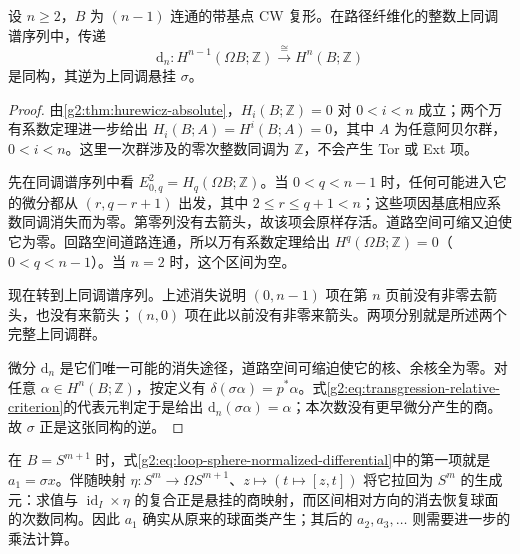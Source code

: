 \begin{proposition}\label{g2:prop:first-transgression-suspension}
	设 \(n\ge2\)，\(B\) 为 \((n-1)\) 连通的带基点 CW 复形。在路径纤维化的整数上同调谱序列中，传递
	\[
		\mathrm d_n:H^{n-1}(\Omega B;\mathbb Z)\xrightarrow{\cong}H^n(B;\mathbb Z)
	\]
	是同构，其逆为上同调悬挂 \(\sigma\)。
\end{proposition}
\begin{proof}
	由\cref{g2:thm:hurewicz-absolute}，\(H_i(B;\mathbb Z)=0\) 对 \(0<i<n\) 成立；两个万有系数定理进一步给出 \(H_i(B;A)=H^i(B;A)=0\)，其中 \(A\) 为任意阿贝尔群，\(0<i<n\)。这里一次群涉及的零次整数同调为 \(\mathbb Z\)，不会产生 Tor 或 Ext 项。

	先在同调谱序列中看 \(E^2_{0,q}=H_q(\Omega B;\mathbb Z)\)。当 \(0<q<n-1\) 时，任何可能进入它的微分都从 \((r,q-r+1)\) 出发，其中 \(2\le r\le q+1<n\)；这些项因基底相应系数同调消失而为零。第零列没有去箭头，故该项会原样存活。道路空间可缩又迫使它为零。回路空间道路连通，所以万有系数定理给出 \(H^q(\Omega B;\mathbb Z)=0\)（\(0<q<n-1\)）。当 \(n=2\) 时，这个区间为空。

	现在转到上同调谱序列。上述消失说明 \((0,n-1)\) 项在第 \(n\) 页前没有非零去箭头，也没有来箭头；\((n,0)\) 项在此以前没有非零来箭头。两项分别就是所述两个完整上同调群。

	微分 \(\mathrm d_n\) 是它们唯一可能的消失途径，道路空间可缩迫使它的核、余核全为零。对任意 \(\alpha\in H^n(B;\mathbb Z)\)，按定义有 \(\delta(\sigma\alpha)=p^*\alpha\)。式\eqref{g2:eq:transgression-relative-criterion}的代表元判定于是给出 \(\mathrm d_n(\sigma\alpha)=\alpha\)；本次数没有更早微分产生的商。故 \(\sigma\) 正是这张同构的逆。
\end{proof}

在 \(B=S^{m+1}\) 时，式\eqref{g2:eq:loop-sphere-normalized-differential}中的第一项就是 \(a_1=\sigma x\)。伴随映射 \(\eta:S^m\to\Omega S^{m+1}\)、\(z\mapsto(t\mapsto[z,t])\) 将它拉回为 \(S^m\) 的生成元：求值与 \(\operatorname{id}_I\times\eta\) 的复合正是悬挂的商映射，而区间相对方向的消去恢复球面的次数同构。因此 \(a_1\) 确实从原来的球面类产生；其后的 \(a_2,a_3,\ldots\) 则需要进一步的乘法计算。

